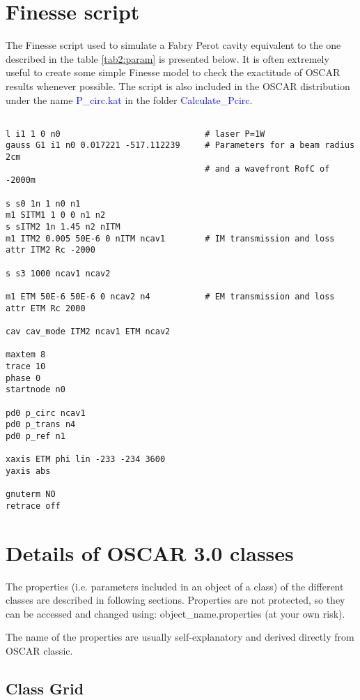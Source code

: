 \chapter{Finesse script}
\label{chaB}

The Finesse script \cite{Finesse} used to simulate a Fabry Perot cavity equivalent to the one described in the table \ref{tab2:param} is presented below. It is often extremely useful to create some simple Finesse model to check the exactitude of OSCAR results whenever possible. The script is also included in the OSCAR distribution under the name \textcolor{blue}{P\_circ.kat} in the folder \textcolor{blue}{Calculate\_Pcirc}.

\begin{verbatim}

l i1 1 0 n0                             # laser P=1W
gauss G1 i1 n0 0.017221 -517.112239     # Parameters for a beam radius 2cm
                                        # and a wavefront RofC of -2000m

s s0 1n 1 n0 n1
m1 SITM1 1 0 0 n1 n2
s sITM2 1n 1.45 n2 nITM
m1 ITM2 0.005 50E-6 0 nITM ncav1        # IM transmission and loss
attr ITM2 Rc -2000

s s3 1000 ncav1 ncav2

m1 ETM 50E-6 50E-6 0 ncav2 n4           # EM transmission and loss
attr ETM Rc 2000

cav cav_mode ITM2 ncav1 ETM ncav2

maxtem 8
trace 10
phase 0
startnode n0

pd0 p_circ ncav1
pd0 p_trans n4
pd0 p_ref n1

xaxis ETM phi lin -233 -234 3600
yaxis abs

gnuterm NO
retrace off

\end{verbatim}


\chapter{Details of OSCAR 3.0 classes}
The properties (i.e. parameters included in an object of a class) of the different classes are described in following sections. Properties are not protected, so they can be accessed and changed using: object\_name.properties (at your own risk).

The name of the properties are usually self-explanatory and derived directly from OSCAR classic.

\section{Class Grid}

